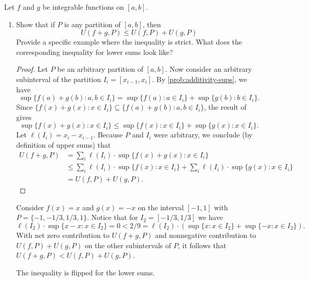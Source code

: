 \begin{problem}
  Let $f$ and $g$ be integrable functions on $[a, b]$.
  \begin{enumerate}[label=(\alph*)]
    \item Show that if $P$ is any partition of $[a, b]$, then
      \[
        U(f + g, P) \leq U(f, P) + U(g, P)
      \]
      Provide a specific example where the inequality is strict. What does the corresponding inequality for lower sums look like?
      \label{prob:additivity-upper-lower-sums-inequalities}

      \begin{proof}
        Let $P$ be an arbitrary partition of $[a, b]$. Now consider an arbitrary subinterval of the partition $I_{i} = [x_{i-1}, x_i]$.
        By \ref{prob:additivity-sups}, we have
        \[
          \sup \{f(a) + g(b) : a, b \in I_{i} \} = \sup \{f(a) : a \in I_{i} \} + \sup \{g(b) : b \in I_{i} \}.
        \]
        Since $\{ f(x) + g(x) : x \in I_{i} \} \subseteq \{f(a) + g(b) : a, b \in I_{i} \}$, the result of 
        gives 
        \[
          \sup \{f(x) + g(x) : x \in I_{i} \} \leq \sup \{f(x) : x \in I_{i} \} + \sup \{g(x) : x \in I_{i} \}.
        \]
        Let $\ell(I_{i}) = x_{i} - x_{i-1}$. Because $P$ and $I_{i}$ were arbitrary, we conclude (by definition of upper sums) that
        \begin{align*}
          U(f + g, P) &= \sum_{i} \ell(I_{i}) \cdot \sup \{ f(x) + g(x) : x \in I_{i} \} \\
                      & \leq \sum_{i} \ell(I_{i}) \cdot \sup \{ f(x) : x \in I_{i} \} + \sum_{i} \ell(I_{i}) \cdot \sup \{ g(x) : x \in I_{i} \} \\
                      &= U(f, P) + U(g, P).
        \end{align*}
      \end{proof}

      Consider $f(x) = x$ and $g(x) = -x$ on the interval $[-1, 1]$ with $P = \{ -1, -1/3, 1/3, 1 \}$. 
      Notice that for $I_{2} = [-1/3, 1/3]$ we have
      \[
        \ell(I_{2}) \cdot \sup \{ x-x : x \in I_{2} \} = 0 < 2/9 = \ell(I_{2}) \cdot \left( \sup \{ x : x \in I_{2} \} + \sup \{ -x : x \in I_{2} \} \right).
      \]
      With net zero contribution to $U(f + g, P)$ and nonnegative contribution to $U(f, P) + U(g, P)$ 
      on the other subintervals of $P$, it follows that $U(f + g, P) < U(f, P) + U(g, P)$.

      The inequality is flipped for the lower sums.


\end{enumerate}
\end{problem}
